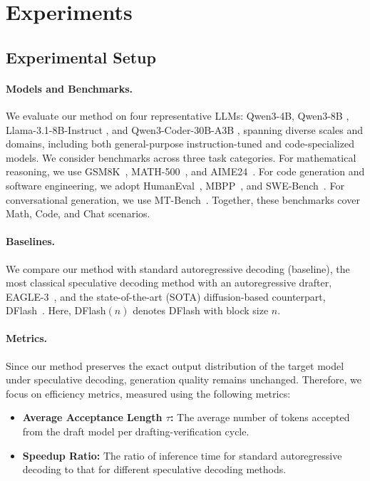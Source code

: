 \documentclass{article}
\begin{document}
\section{Experiments}
\label{Experiments}
\subsection{Experimental Setup}
\paragraph{Models and Benchmarks.}
We evaluate our method on four representative LLMs: Qwen3-4B, Qwen3-8B \cite{yang2025qwen3}, Llama-3.1-8B-Instruct \cite{grattafiori2024llama}, and Qwen3-Coder-30B-A3B \cite{cao2026qwen3}, spanning diverse scales and domains, including both general-purpose instruction-tuned and code-specialized models. We consider benchmarks across three task categories. For mathematical reasoning, we use GSM8K~\citep{cobbe2021training}, MATH-500~\citep{lightman2023let}, and AIME24~\citep{AIME}. For code generation and software engineering, we adopt HumanEval~\citep{chen2021evaluating}, MBPP~\citep{austin2021program}, and SWE-Bench~\citep{jimenez2023swe}. For conversational generation, we use MT-Bench~\citep{zheng2023judging}. Together, these benchmarks cover Math, Code, and Chat scenarios.

\paragraph{Baselines.}
We compare our method with standard autoregressive decoding (baseline), the most classical speculative decoding method with an autoregressive drafter, EAGLE-3~\citep{li2025eagle3scalinginferenceacceleration}, and the state-of-the-art (SOTA) diffusion-based counterpart, DFlash~\citep{chen2026dflash}. Here, DFlash$(n)$ denotes DFlash with block size $n$.

\paragraph{Metrics.}
Since our method preserves the exact output distribution of the target model under speculative decoding, generation quality remains unchanged. Therefore, we focus on efficiency metrics, measured using the following metrics:
\begin{itemize}[leftmargin=*]
    \item \textbf{Average Acceptance Length $\tau$:} The average number of tokens accepted from the draft model per drafting-verification cycle.
    \item \textbf{Speedup Ratio:} The ratio of inference time for standard autoregressive decoding to that for different speculative decoding methods.
\end{itemize}
\end{document}
